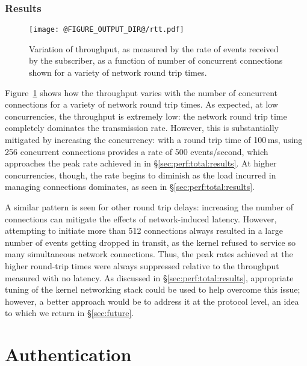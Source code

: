 \documentclass[5p,authoryear]{elsarticle}
\begin{document}
\subsubsection{Results}

\begin{figure}
  \begin{center}
  \texttt{[image: @FIGURE\_OUTPUT\_DIR@/rtt.pdf]}
  \end{center}

  \caption{Variation of throughput, as measured by the rate of events received
  by the subscriber, as a function of number of concurrent connections shown
  for a variety of network round trip times.}

  \label{fig:rtt}
\end{figure}

Figure~\ref{fig:rtt} shows how the throughput varies with the number of
concurrent connections for a variety of network round trip times. As expected,
at low concurrencies, the throughput is extremely low: the network round trip
time completely dominates the transmission rate. However, this is
substantially mitigated by increasing the concurrency: with a round trip time
of 100\,ms, using 256 concurrent connections provides a rate of 500
events/second, which approaches the peak rate achieved in in
\S\ref{sec:perf:total:results}. At higher concurrencies, though, the rate
begins to diminish as the load incurred in managing connections dominates,
as seen in \S\ref{sec:perf:total:results}.

A similar pattern is seen for other round trip delays: increasing the number
of connections can mitigate the effects of network-induced latency. However,
attempting to initiate more than 512 connections always resulted in a large
number of events getting dropped in transit, as the kernel refused to service
so many simultaneous network connections. Thus, the peak rates achieved at the
higher round-trip times were always suppressed relative to the throughput
measured with no latency. As discussed in \S\ref{sec:perf:total:results},
appropriate tuning of the kernel networking stack could be used to help
overcome this issue; however, a better approach would be to address it at the
protocol level, an idea to which we return in \S\ref{sec:future}.

\section{Authentication}
\label{sec:security}
\end{document}
